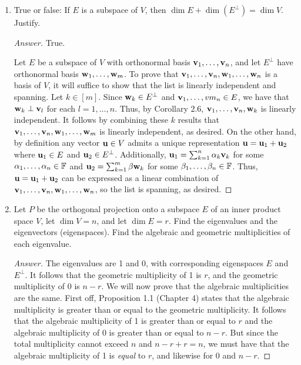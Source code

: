 \documentclass[../psets.tex]{subfiles}
\begin{document}
\begin{enumerate}[label={\textbf{3.\arabic*.}}]
\begin{proof}[Answer]
\begin{align*}
            \norm{\wm} &= \sqrt{\norm{\vm}^2-\norm{\frac{(\vm,\vm_1)}{\norm{\vm_1}^2}\vm_1}^2-\norm{\frac{(\vm,\vm_2)}{\norm{\vm_2}^2}\vm_2}^2}\\
            &= \sqrt{\norm{\vm}^2-\frac{(\vm,\vm_1)^2}{\norm{\vm_1}^2}-\frac{(\vm,\vm_2)^2}{\norm{\vm_2}^2}}\\
            &= \sqrt{30-\frac{2^2}{3}-\frac{12^2}{7}}\\
            &= \sqrt{170/21}
        \end{align*}
    \end{proof}
    \item True or false: If $E$ is a subspace of $V$, then $\dim E+\dim(E^\perp)=\dim V$. Justify.
    \begin{proof}[Answer]
        True.\par
        Let $E$ be a subspace of $V$ with orthonormal basis $\mathbf{v}_1,\dots,\mathbf{v}_n$, and let $E^\perp$ have orthonormal basis $\mathbf{w}_1,\dots,\mathbf{w}_m$. To prove that $\mathbf{v}_1,\dots,\mathbf{v}_n,\mathbf{w}_1,\dots,\mathbf{w}_n$ is a basis of $V$, it will suffice to show that the list is linearly independent and spanning. Let $k\in[m]$. Since $\mathbf{w}_k\in E^\perp$ and $\mathbf{v}_1,\dots,vm_n\in E$, we have that $\mathbf{w}_k\perp\mathbf{v}_l$ for each $l=1,\dots,n$. Thus, by Corollary 2.6, $\mathbf{v}_1,\dots,\mathbf{v}_n,\mathbf{w}_k$ is linearly independent. It follows by combining these $k$ results that $\mathbf{v}_1,\dots,\mathbf{v}_n,\mathbf{w}_1,\dots,\mathbf{w}_m$ is linearly independent, as desired. On the other hand, by definition any vector $\mathbf{u}\in V$ admits a unique representation $\mathbf{u}=\mathbf{u}_1+\mathbf{u}_2$ where $\mathbf{u}_1\in E$ and $\mathbf{u}_2\in E^\perp$. Additionally, $\mathbf{u}_1=\sum_{k=1}^n\alpha_k\mathbf{v}_k$ for some $\alpha_1,\dots,\alpha_n\in\mathbb{F}$ and $\mathbf{u}_2=\sum_{k=1}^m\beta\mathbf{w}_k$ for some $\beta_1,\dots,\beta_n\in\mathbb{F}$. Thus, $\mathbf{u}=\mathbf{u}_1+\mathbf{u}_2$ can be expressed as a linear combination of $\mathbf{v}_1,\dots,\mathbf{v}_n,\mathbf{w}_1,\dots,\mathbf{w}_n$, so the list is spanning, as desired.
    \end{proof}
    \item Let $P$ be the orthogonal projection onto a subspace $E$ of an inner product space $V$, let $\dim V=n$, and let $\dim E=r$. Find the eigenvalues and the eigenvectors (eigenspaces). Find the algebraic and geometric multiplicities of each eigenvalue.
    \begin{proof}[Answer]
        The eigenvalues are 1 and 0, with corresponding eigenspaces $E$ and $E^\perp$. It follows that the geometric multiplicity of 1 is $r$, and the geometric multiplicity of 0 is $n-r$. We will now prove that the algebraic multiplicities are the same. First off, Proposition 1.1 (Chapter 4) states that the algebraic multiplicity is greater than or equal to the geometric multiplicity. It follows that the algebraic multiplicity of 1 is greater than or equal to $r$ and the algebraic multiplicity of 0 is greater than or equal to $n-r$. But since the total multiplicity cannot exceed $n$ and $n-r+r=n$, we must have that the algebraic multiplicity of 1 is \emph{equal} to $r$, and likewise for 0 and $n-r$.

\end{proof}
\end{enumerate}
\end{document}
